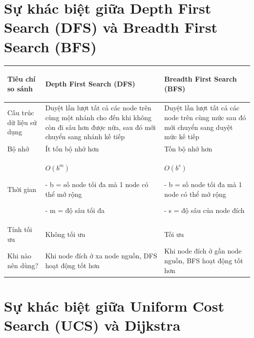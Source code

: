 \section{Sự khác biệt giữa Depth First Search (DFS) và Breadth First Search (BFS)}
\begin{center}
    \begin{tabular}{ |m{3cm}|m{6cm}|m{6cm}|}
    \hline
    \rowcolor[RGB]{229,229,229} 
    \begin{center}\textbf{Tiêu chí so sánh}\end{center} & \begin{center}\textbf{Depth First Search (DFS)}\end{center} & \begin{center}\textbf{Breadth First Search (BFS)}\end{center}  \\ \hline
    \centering Cấu trúc dữ liệu sử dụng & Duyệt lần lượt tất cả các node trên cùng một nhánh cho đến khi không còn đi sâu hơn được nữa, sau đó mới chuyển sang nhánh kế tiếp & Duyệt lần lượt tất cả các node trên cùng mức sau đó mới chuyển sang duyệt mức kế tiếp  \\ \hline
    \centering Bộ nhớ & Ít tốn bộ nhớ hơn & Tốn bộ nhớ hơn \\ \hline
    \centering Thời gian & $O(b^m)$ \par
   - b = số node tối đa mà 1 node có thể mở rộng \par
   - m = độ sâu tối đa & $O(b^s)$ \par
   - b = số node tối đa mà 1 node có thể mở rộng \par
   - s = độ sâu của node đích  \\ \hline
    \centering Tính tối ưu & Không tối ưu & Tối ưu \\ \hline
    \centering Khi nào nên dùng? & Khi node đích ở xa node nguồn, DFS hoạt động tốt hơn & Khi node đích ở gần node nguồn, BFS hoạt động tốt hơn \\ \hline
    \end{tabular}
\end{center}

\section{Sự khác biệt giữa Uniform Cost Search (UCS) và Dijkstra}

